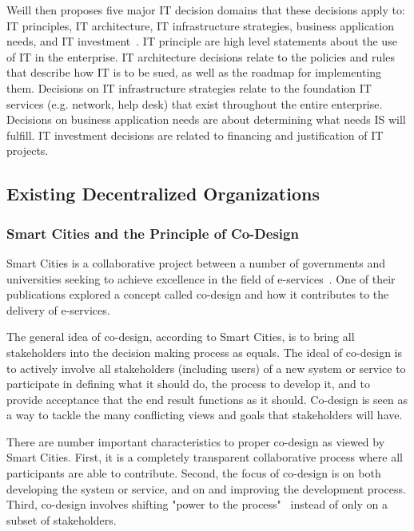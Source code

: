 Weill then proposes five major IT decision domains that these decisions apply to: IT principles, IT architecture, IT infrastructure strategies, business application needs, and IT investment~\cite{Weill2004}. IT principle are high level statements about the use of IT in the enterprise. IT architecture decisions relate to the policies and rules that describe how IT is to be sued, as well as the roadmap for implementing them. Decisions on IT infrastructure strategies relate to the foundation IT services (e.g. network, help desk) that exist throughout the entire enterprise.  Decisions on business application needs are about determining what needs IS will fulfill. IT investment decisions are related to financing and justification of IT projects.




\subsection{Existing Decentralized Organizations}

\subsubsection{Smart Cities and the Principle of Co-Design}


Smart Cities is a collaborative project between a number of governments and universities seeking to achieve excellence in the field of e-services~\cite{Cities}. One of their publications explored a concept called co-design and how it contributes to the delivery of e-services. 

The general idea of co-design, according to Smart Cities, is to bring all stakeholders into the decision making process as equals. The ideal of co-design is to actively involve all stakeholders (including users) of a new system or service to participate in defining what it should do, the process to develop it, and to provide acceptance that the end result functions as it should. Co-design is seen as a way to tackle the many conflicting views and goals that stakeholders will have. 

There are number important characteristics to proper co-design as viewed by Smart Cities. First, it is a completely transparent collaborative process where all participants are able to contribute. Second, the focus of co-design is on both developing the system or service, and on and improving the development process. Third, co-design involves shifting "power to the process"~\cite{Cities} instead of only on a subset of stakeholders.

